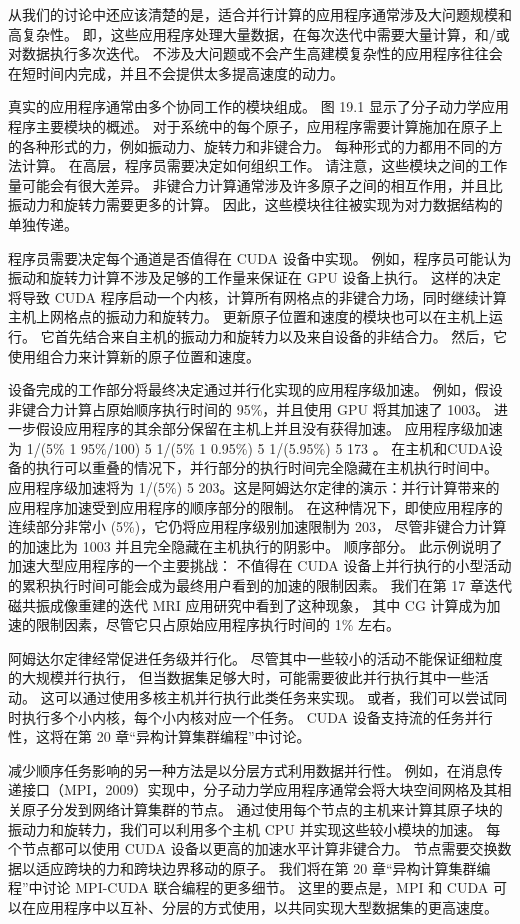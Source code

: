 从我们的讨论中还应该清楚的是，适合并行计算的应用程序通常涉及大问题规模和高复杂性。 
即，这些应用程序处理大量数据，在每次迭代中需要大量计算，和/或对数据执行多次迭代。 
不涉及大问题或不会产生高建模复杂性的应用程序往往会在短时间内完成，并且不会提供太多提高速度的动力。

真实的应用程序通常由多个协同工作的模块组成。 图 19.1 显示了分子动力学应用程序主要模块的概述。 
对于系统中的每个原子，应用程序需要计算施加在原子上的各种形式的力，例如振动力、旋转力和非键合力。 
每种形式的力都用不同的方法计算。 在高层，程序员需要决定如何组织工作。 请注意，这些模块之间的工作量可能会有很大差异。 
非键合力计算通常涉及许多原子之间的相互作用，并且比振动力和旋转力需要更多的计算。 
因此，这些模块往往被实现为对力数据结构的单独传递。

程序员需要决定每个通道是否值得在 CUDA 设备中实现。 
例如，程序员可能认为振动和旋转力计算不涉及足够的工作量来保证在 GPU 设备上执行。 
这样的决定将导致 CUDA 程序启动一个内核，计算所有网格点的非键合力场，同时继续计算主机上网格点的振动力和旋转力。 
更新原子位置和速度的模块也可以在主机上运行。 它首先结合来自主机的振动力和旋转力以及来自设备的非结合力。 
然后，它使用组合力来计算新的原子位置和速度。

设备完成的工作部分将最终决定通过并行化实现的应用程序级加速。 
例如，假设非键合力计算占原始顺序执行时间的 95\%，并且使用 GPU 将其加速了 1003。 
进一步假设应用程序的其余部分保留在主机上并且没有获得加速。 
应用程序级加速为 1/(5\% 1 95\%/100) 5 1/(5\% 1 0.95\%) 5 1/(5.95\%) 5 173 。 
在主机和CUDA设备的执行可以重叠的情况下，并行部分的执行时间完全隐藏在主机执行时间中。 
应用程序级加速将为 1/(5\%) 5 203。这是阿姆达尔定律的演示：并行计算带来的应用程序加速受到应用程序的顺序部分的限制。 
在这种情况下，即使应用程序的连续部分非常小 (5\%)，它仍将应用程序级别加速限制为 203，
尽管非键合力计算的加速比为 1003 并且完全隐藏在主机执行的阴影中。 
顺序部分。 此示例说明了加速大型应用程序的一个主要挑战：
不值得在 CUDA 设备上并行执行的小型活动的累积执行时间可能会成为最终用户看到的加速的限制因素。 
我们在第 17 章迭代磁共振成像重建的迭代 MRI 应用研究中看到了这种现象，
其中 CG 计算成为加速的限制因素，尽管它只占原始应用程序执行时间的 1\% 左右。

阿姆达尔定律经常促进任务级并行化。 尽管其中一些较小的活动不能保证细粒度的大规模并行执行，
但当数据集足够大时，可能需要彼此并行执行其中一些活动。 这可以通过使用多核主机并行执行此类任务来实现。 
或者，我们可以尝试同时执行多个小内核，每个小内核对应一个任务。 
CUDA 设备支持流的任务并行性，这将在第 20 章“异构计算集群编程”中讨论。

减少顺序任务影响的另一种方法是以分层方式利用数据并行性。 
例如，在消息传递接口（MPI，2009）实现中，分子动力学应用程序通常会将大块空间网格及其相关原子分发到网络计算集群的节点。 
通过使用每个节点的主机来计算其原子块的振动力和旋转力，我们可以利用多个主机 CPU 并实现这些较小模块的加速。 
每个节点都可以使用 CUDA 设备以更高的加速水平计算非键合力。 节点需要交换数据以适应跨块的力和跨块边界移动的原子。 
我们将在第 20 章“异构计算集群编程”中讨论 MPI-CUDA 联合编程的更多细节。 
这里的要点是，MPI 和 CUDA 可以在应用程序中以互补、分层的方式使用，以共同实现大型数据集的更高速度。

